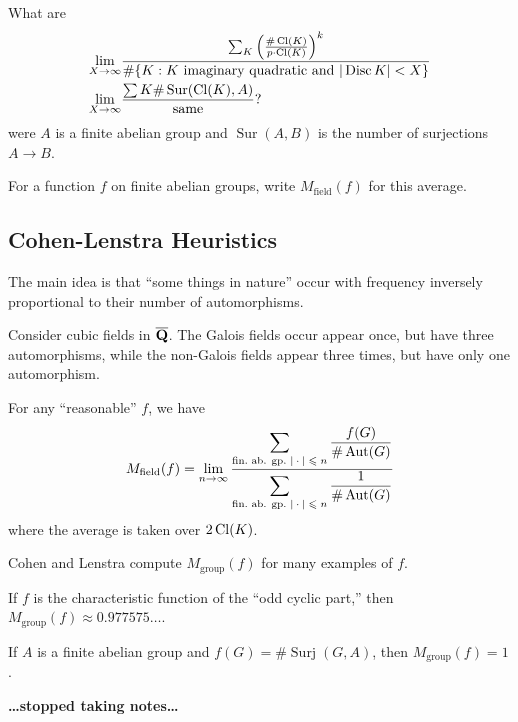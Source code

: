 \begin{example}
What are 
\begin{align*}
  \lim_{X\to \infty} &\frac{\sum_K \left(\frac{\# \operatorname{Cl}(K)}{p\cdot \operatorname{Cl}(K)}\right)^k}{\#\{K:\text{$K$ imaginary quadratic and $|\operatorname{Disc} K|<X$}\}} \\ 
  \lim_{X\to \infty} &\frac{\sum K \#\operatorname{Sur}(\operatorname{Cl}(K), A)}{\text{same}} ?
\end{align*}
were $A$ is a finite abelian group and $\operatorname{Sur}(A,B)$ is the number 
of surjections $A\to B$. 
\end{example}

For a function $f$ on finite abelian groups, write $M_\text{field}(f)$ for this 
average. 





\subsection{Cohen-Lenstra Heuristics}

The main idea is that ``some things in nature'' occur with frequency inversely 
proportional to their number of automorphisms. 

\begin{example}
Consider cubic fields in $\overline{\mathbf{Q}}$. The Galois fields occur appear once, but 
have three automorphisms, while the non-Galois fields appear three times, but 
have only one automorphism. 
\end{example}

\begin{conjecture}[Cohen-Lenstra, Gerth for $p=2$]
For any ``reasonable'' $f$, we have 
\[
  M_\text{field}(f) = \lim_{n\to \infty}\frac{\displaystyle\sum_\text{fin.\ ab. gp.\ $|\cdot |\leqslant n$} \frac{f(G)}{\#\operatorname{Aut}(G)}}{\displaystyle\sum_\text{fin.\ ab. gp.\ $|\cdot |\leqslant n$} \frac{1}{\#\operatorname{Aut}(G)}}
\]
where the average is taken over $2\operatorname{Cl}(K)$. 
\end{conjecture}

Cohen and Lenstra compute $M_\text{group}(f)$ for many examples of $f$. 

\begin{example}
If $f$ is the characteristic function of the ``odd cyclic part,'' then 
$M_\text{group}(f)\approx 0.977575\ldots$. 
\end{example}

\begin{example}
If $A$ is a finite abelian group and $f(G)=\#\operatorname{Surj}(G,A)$, then 
$M_\text{group}(f) = 1$. 
\end{example}

\textbf{\ldots stopped taking notes\ldots}




